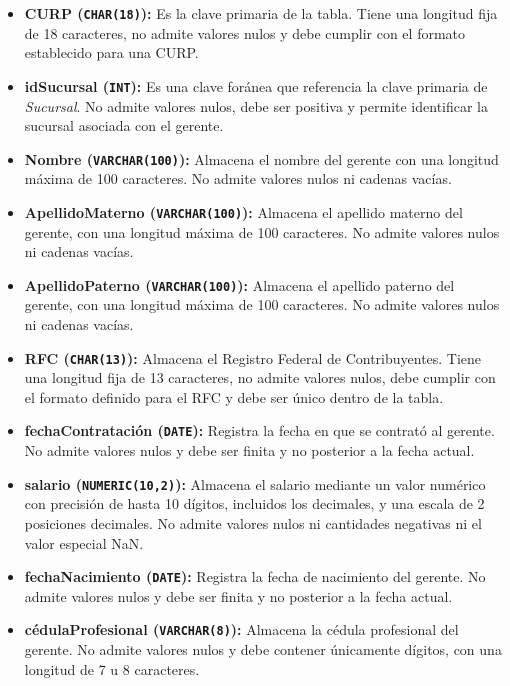 \begin{itemize}
    \item \textbf{CURP (\texttt{CHAR(18)}):} Es la clave primaria de la tabla. Tiene una longitud fija de 18 caracteres, no admite valores nulos y debe cumplir con el formato establecido para una CURP.

    \item \textbf{idSucursal (\texttt{INT}):} Es una clave foránea que referencia la clave primaria de \textit{Sucursal}. No admite valores nulos, debe ser positiva y permite identificar la sucursal asociada con el gerente.

    \item \textbf{Nombre (\texttt{VARCHAR(100)}):} Almacena el nombre del gerente con una longitud máxima de 100 caracteres. No admite valores nulos ni cadenas vacías.

    \item \textbf{ApellidoMaterno (\texttt{VARCHAR(100)}):} Almacena el apellido materno del gerente, con una longitud máxima de 100 caracteres. No admite valores nulos ni cadenas vacías.

    \item \textbf{ApellidoPaterno (\texttt{VARCHAR(100)}):} Almacena el apellido paterno del gerente, con una longitud máxima de 100 caracteres. No admite valores nulos ni cadenas vacías.

    \item \textbf{RFC (\texttt{CHAR(13)}):} Almacena el Registro Federal de Contribuyentes. Tiene una longitud fija de 13 caracteres, no admite valores nulos, debe cumplir con el formato definido para el RFC y debe ser único dentro de la tabla.

    \item \textbf{fechaContratación (\texttt{DATE}):} Registra la fecha en que se contrató al gerente. No admite valores nulos y debe ser finita y no posterior a la fecha actual.

    \item \textbf{salario (\texttt{NUMERIC(10,2)}):} Almacena el salario mediante un valor numérico con precisión de hasta 10 dígitos, incluidos los decimales, y una escala de 2 posiciones decimales. No admite valores nulos ni cantidades negativas ni el valor especial NaN.

    \item \textbf{fechaNacimiento (\texttt{DATE}):} Registra la fecha de nacimiento del gerente. No admite valores nulos y debe ser finita y no posterior a la fecha actual.

    \item \textbf{cédulaProfesional (\texttt{VARCHAR(8)}):} Almacena la cédula profesional del gerente. No admite valores nulos y debe contener únicamente dígitos, con una longitud de 7 u 8 caracteres.
\end{itemize}

